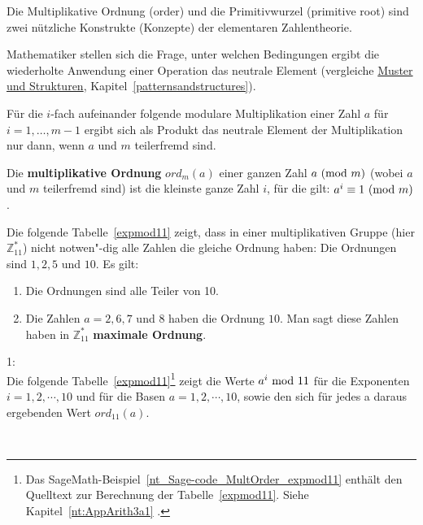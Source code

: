 \begin{refsegment}
Die Multiplikative Ordnung (order) und die Primitivwurzel (primitive root)
sind zwei nützliche Konstrukte (Konzepte) der elementaren Zahlentheorie.

Mathematiker stellen sich die Frage, unter welchen Bedingungen ergibt
die wiederholte Anwendung einer Operation das neutrale Element
(vergleiche \hyperlink{patternsandstructures}{Muster und Strukturen},
Kapitel~\ref{patternsandstructures}).

Für die $i$-fach aufeinander folgende modulare Multiplikation einer
Zahl $a$ für \mbox{$i=1, \dots, m-1$} ergibt sich als Produkt das neutrale
Element der Multiplikation nur dann, wenn $a$ und $m$
teilerfremd sind.

\begin{definition}\label{def-zth-ordn}
Die {\bf multiplikative Ordnung} 
$ord_m(a)$ einer ganzen Zahl $a {\rm ~(mod~} m)$ (wobei $a$ und $m$
teilerfremd sind) ist die kleinste ganze Zahl $i$, für die gilt:
 $a^i \equiv 1 {\rm ~(mod~} m)$.
\end{definition}

Die folgende Tabelle~\ref{expmod11} zeigt, dass in einer multiplikativen Gruppe
(hier $\mathbb{Z}_{11}^*$) nicht notwen"-dig alle Zahlen die gleiche Ordnung
haben: Die Ordnungen sind $1, 2, 5$ und $10$. Es gilt:
\begin{enumerate}
  \item Die Ordnungen sind alle Teiler von 10.
  \item Die Zahlen $a = 2, 6, 7$ und $8$ haben die Ordnung $10$.
        Man sagt diese Zahlen haben in $\mathbb{Z}_{11}^*$
        {\bf maximale Ordnung}.
\end{enumerate}

\newpage
\begin{example}{ 1:}\\
Die folgende Tabelle~\ref{expmod11}\footnote{%
  Das SageMath-Beispiel~\ref{nt_Sage-code_MultOrder_expmod11} enthält den
  Quelltext zur Berechnung der Tabelle~\ref{expmod11}.
  Siehe Kapitel~\ref{nt:AppArith3a1} \glqq {}\grqq.}
zeigt die Werte $a^i{\rm ~mod~}11$ für die Exponenten $i = 1, 2, \cdots, 10$
und für die Basen $a = 1, 2, \cdots, 10$, sowie den sich für jedes a daraus
ergebenden Wert $ord_{11}(a)$.
\end{example}\\


\end{refsegment}

